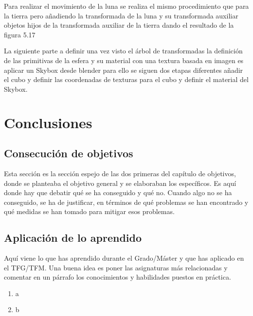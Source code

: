 \documentclass[a4paper, 17pt]{book}
\begin{document}
Para realizar el movimiento de la luna se realiza el mismo procedimiento que para la tierra pero añadiendo la transformada de la
luna y su transformada auxiliar objetos hijos de la transformada auxiliar de la tierra dando el resultado de la figura 5.17

La siguiente parte a definir una vez visto el árbol de transformadas la definición de las primitivas de la esfera y su material con
una textura basada en imagen es aplicar un Skybox desde blender para ello se siguen dos etapas diferentes añadir el cubo y definir
las coordenadas de texturas para el cubo y definir el material del Skybox.




\cleardoublepage
\chapter{Conclusiones}
\label{chap:conclusiones}


\section{Consecución de objetivos}
\label{sec:consecucion-objetivos}

Esta sección es la sección espejo de las dos primeras del capítulo de objetivos,
donde se planteaba el objetivo general y se elaboraban los específicos.
\bigbreak
Es aquí donde hay que debatir qué se ha conseguido y qué no. Cuando algo no
se ha conseguido, se ha de justificar, en términos de qué problemas se han
encontrado y qué medidas se han tomado para mitigar esos problemas.


\section{Aplicación de lo aprendido}
\label{sec:aplicacion}

Aquí viene lo que has aprendido durante el Grado/Máster y que has aplicado
en el TFG/TFM. Una buena idea es poner las asignaturas más relacionadas y
comentar en un párrafo los conocimientos y habilidades puestos en práctica.

\begin{enumerate}
  \item a
  \item b
\end{enumerate}
\end{document}

